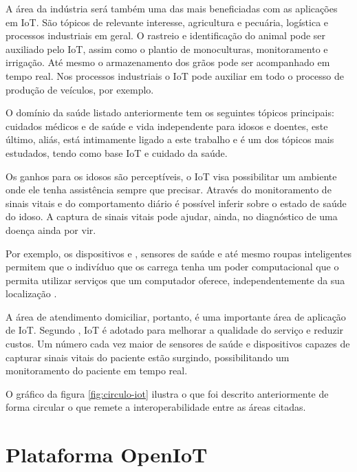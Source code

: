 A área da indústria será também uma das mais beneficiadas com as aplicações em IoT.
São tópicos de relevante interesse, agricultura e pecuária, logística e 
processos industriais em geral. O rastreio e identificação do animal pode ser
auxiliado pelo IoT, assim como o plantio de monoculturas, monitoramento e 
irrigação. Até mesmo o armazenamento dos grãos pode ser acompanhado em tempo
real. Nos processos industriais o IoT pode auxiliar em todo o processo
de produção de veículos, por exemplo. 

O domínio da saúde listado anteriormente tem os seguintes tópicos principais:
cuidados médicos e de saúde e vida independente para idosos e doentes, este último, aliás,
está intimamente ligado a este trabalho e é um dos tópicos mais estudados, tendo
como base IoT e cuidado da saúde.

Os ganhos para os idosos são perceptíveis, o IoT visa possibilitar um ambiente
onde ele tenha assistência sempre que precisar. Através do monitoramento de 
sinais vitais e do comportamento diário é possível inferir sobre o estado 
de saúde do idoso. A captura de sinais vitais pode ajudar, ainda, no diagnóstico
de uma doença ainda por vir.

Por exemplo, os dispositivos \smartphones e \smartwatches, sensores de saúde e até 
mesmo roupas inteligentes permitem que o indivíduo que os carrega tenha um poder 
computacional que o permita utilizar serviços que um computador oferece, 
independentemente da sua localização \cite{de2003computaccao}.

A área de atendimento domiciliar, portanto, é uma importante área de aplicação de IoT.
Segundo , IoT é adotado para melhorar a qualidade
do serviço e reduzir custos. Um número cada vez maior de sensores de saúde e
dispositivos capazes de capturar sinais vitais do paciente estão
surgindo, possibilitando um monitoramento do paciente em tempo real.

O gráfico da figura \ref{fig:circulo-iot} ilustra o que foi descrito
anteriormente de forma circular o que remete a interoperabilidade entre as
áreas citadas.


\section{Plataforma OpenIoT}\label{sec:openiot}

